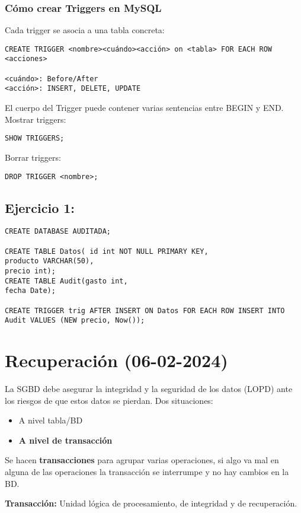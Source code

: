 \documentclass{article}
\begin{document}
\subsubsection{Cómo crear Triggers en MySQL}
Cada trigger se asocia a una tabla concreta:
\begin{verbatim}
CREATE TRIGGER <nombre><cuándo><acción> on <tabla> FOR EACH ROW <acciones>

<cuándo>: Before/After
<acción>: INSERT, DELETE, UPDATE
\end{verbatim}
El cuerpo del Trigger puede contener varias sentencias entre BEGIN y END.
Mostrar triggers:
\begin{verbatim}
SHOW TRIGGERS;
\end{verbatim}
Borrar triggers:
\begin{verbatim}
DROP TRIGGER <nombre>;
\end{verbatim}
\subsection{Ejercicio 1:}
\begin{verbatim}
CREATE DATABASE AUDITADA;

CREATE TABLE Datos( id int NOT NULL PRIMARY KEY,
producto VARCHAR(50), 
precio int);
CREATE TABLE Audit(gasto int,
fecha Date);

CREATE TRIGGER trig AFTER INSERT ON Datos FOR EACH ROW INSERT INTO 
Audit VALUES (NEW precio, Now());
\end{verbatim}
\section{Recuperación (06-02-2024)}

La SGBD debe asegurar la integridad y la seguridad de los datos (LOPD) ante los riesgos de que estos datos se pierdan. 
Dos situaciones:
\begin{itemize}
	\item A nivel tabla/BD
	\item \textbf{A nivel de transacción}
\end{itemize}

Se hacen \textbf{transacciones} para agrupar varias operaciones, si algo va mal en alguna de las operaciones la transacción se interrumpe y no hay cambios en la BD. 
\begin{theorem}
    \textbf{Transacción:} Unidad lógica de procesamiento, de integridad y de recuperación. 
\end{theorem}
\end{document}
